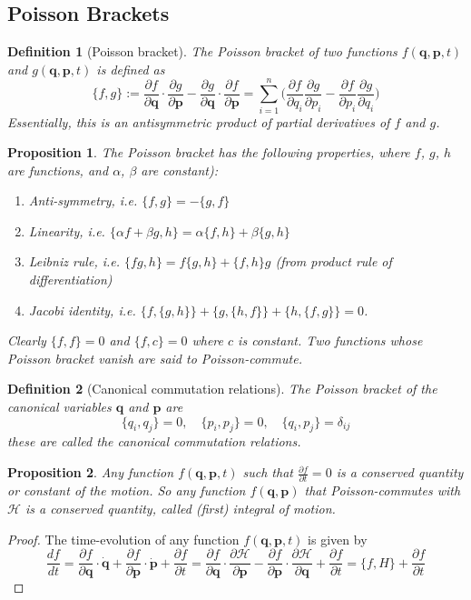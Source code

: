 \documentclass[a4paper]{article}
\newtheorem{defi}{Definition}[section]
\newtheorem{prop}{Proposition}[section]
\theoremstyle{new}
\begin{document}
\subsection{Poisson Brackets}
\begin{defi}[Poisson bracket]
The Poisson bracket of two functions $f(\mathbf{q}, \mathbf{p}, t)$ and $g(\mathbf{q}, \mathbf{p}, t)$ is defined as
$$\{f,g\}:=\frac{\partial f}{\partial\mathbf{q}}\cdot\frac{\partial g}{\partial\mathbf{p}}-\frac{\partial g}{\partial\mathbf{q}}\cdot\frac{\partial f}{\partial\mathbf{p}}=\sum_{i=1}^n\bigg(\frac{\partial f}{\partial q_i}\frac{\partial g}{\partial p_i}-\frac{\partial f}{\partial p_i}\frac{\partial g}{\partial q_i}\bigg)$$
Essentially, this is an antisymmetric product of partial derivatives of $f$ and $g$.
\end{defi}
\begin{prop}
The Poisson bracket has the following properties,  where  $f$, $g$, $h$ are functions, and $\alpha$, $\beta$ are constant):
\begin{enumerate}
    \item Anti-symmetry, i.e. $\{f,g\}=-\{g,f\}$
    \item Linearity, i.e. $\{\alpha f+\beta g,h\}=\alpha\{f,h\}+\beta\{g,h\}$
    \item Leibniz rule, i.e. $\{fg,h\}=f\{g,h\}+\{f,h\}g$ (from product rule of differentiation)
    \item Jacobi identity, i.e. $\{f,\{g,h\}\}+\{g,\{h,f\}\}+\{h,\{f,g\}\}=0$.
\end{enumerate}
Clearly $\{f, f\} = 0$ and $\{f, c\} = 0$ where $c$ is constant. Two functions whose Poisson bracket vanish are said to Poisson-commute.
\end{prop}
\begin{defi}[Canonical commutation relations]
The Poisson bracket of the canonical variables $\mathbf{q}$ and $\mathbf{p}$ are
$$\{q_i,q_j\}=0,\quad\{p_i,p_j\}=0,\quad\{q_i,p_j\}=\delta_{ij}$$
these are called the canonical commutation relations.  
\end{defi}
\begin{prop}
Any function $f(\mathbf{q}, \mathbf{p}, t)$ such that $\frac{\partial f}{\partial t}=0$ is a conserved quantity or constant of the motion. So any function $f(\mathbf{q}, \mathbf{p})$ that Poisson-commutes with $\mathcal{H}$ is a conserved quantity, called (first) integral of motion. 
\end{prop}
\begin{proof}
The time-evolution of any function $f(\mathbf{q}, \mathbf{p}, t)$ is given by
$$\frac{df}{dt}=\frac{\partial f}{\partial\mathbf{q}}\cdot\mathbf{\dot{q}}+\frac{\partial f}{\partial\mathbf{p}}\cdot\mathbf{\dot{p}}+\frac{\partial f}{\partial t}=\frac{\partial f}{\partial\mathbf{q}}\cdot\frac{\partial\mathcal{H}}{\partial\mathbf{p}}-\frac{\partial f}{\partial\mathbf{p}}\cdot\frac{\partial\mathcal{H}}{\partial\mathbf{q}}+\frac{\partial f}{\partial t}=\{f,H\}+\frac{\partial f}{\partial t}$$
\end{proof}
\end{document}
